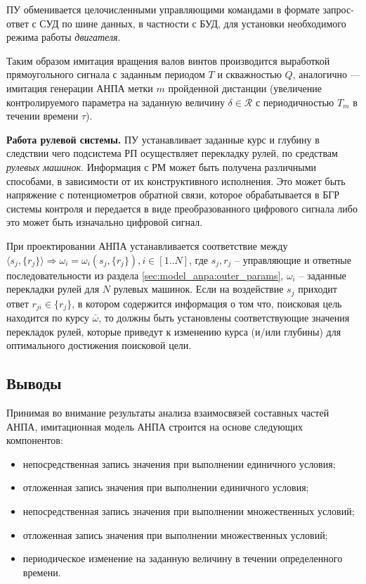 ПУ обменивается целочисленными управляющими командами в формате запрос-ответ с СУД по шине данных, в частности с БУД,
для установки необходимого режима работы \textit{двигателя}.

Таким образом имитация вращения валов винтов производится выработкой прямоугольного сигнала с заданным периодом $T$ и скважностью $Q$,
аналогично --- имитация генерации АНПА метки $m$ пройденной дистанции
(увеличение контролируемого параметра на заданную величину $\delta \in \mathcal{R}$ с периодичностью $T_m$ в течении времени $\tau$).

\textbf{Работа рулевой системы.}
ПУ устанавливает заданные курс и глубину в следствии чего подсистема РП
осуществляет перекладку рулей, по средствам \textit{рулевых машинок}.
Информация с РМ может быть получена различными способами, в зависимости от их конструктивного исполнения.
Это может быть напряжение с потенциометров обратной связи, которое обрабатывается в БГР системы контроля
и передается в виде преобразованного цифрового сигнала
либо это может быть изначально  цифровой сигнал.

При проектировании АНПА устанавливается соответствие между $\langle s_j, \{r_j\} \rangle \Rightarrow \omega_i = \omega_i(s_j, \{r_j\}), i\in [1..N]$,
где $s_j, r_j$ -- управляющие и ответные последовательности из раздела \ref{sec:model_anpa:outer_params},
$\omega_i$ -- заданные перекладки рулей для $N$ рулевых машинок.
Если на воздействие $s_j$ приходит ответ $r_{ji} \in \{r_j\}$, в котором содержится информация о том что,
поисковая цель находится по курсу $\bar \omega$, то должны быть установлены соответствующие значения перекладок рулей,
которые приведут к изменению курса (и/или глубины) для оптимального достижения поисковой цели.


\subsection*{Выводы}
Принимая во внимание результаты анализа взаимосвязей составных частей АНПА,
имитационная модель АНПА строится на основе следующих компонентов:
\begin{itemize}
    \item непосредственная запись значения при выполнении единичного условия;
    \item отложенная запись значения при выполнении единичного условия;
    \item непосредственная запись значения при выполнении множественных условий;
    \item отложенная запись значения при выполнении множественных условий;
    \item периодическое изменение на заданную величину в течении определенного времени.
\end{itemize}

